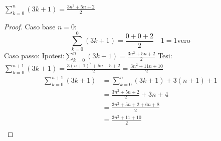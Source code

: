 \begin{thm}
    $\sum _ {k=0} ^ n (3k+1) = \frac{3n^2+5n+2}{2}$
\end{thm}

\begin{proof}
Caso base $n = 0$:
\begin{equation*}
    \sum _ {k = 0} ^ 0 (3k+1) = \frac{0+0+2}{2} \quad 1 = 1 \text{vero}
\end{equation*}
Caso passo:
\quad Ipotesi:$\sum _ {k=0} ^ n (3k+1) = \frac{3n^2+5n+2}{2}$ \newline
\quad Tesi:$\sum _ {k=0} ^ {n+1} (3k+1) = \frac{3(n+1)^2+5n+5+2}{2} = \frac{3n^2+11n+10}{2}$
\begin{equation*}
\begin{split}
\sum _ {k=0} ^ {n+1} (3k+1) & = \sum _ {k = 0} ^ n (3k+1) + 3(n+1)+1\\
                            & = \frac{3n^2+5n+2}{2} + 3n+4\\
                            & = \frac{3n^2+5n+2+6n+8}{2}\\
                            & = \frac{3n^2+11+10}{2}\\
\end{split}
\end{equation*}
\end{proof}
